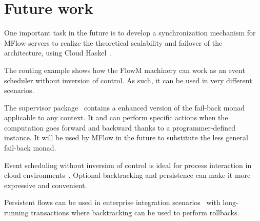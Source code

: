 \documentclass{tmr}
\begin{document}
\section{Future work}  
  
One important task in the future is to develop a synchronization mechanism for MFlow servers to realize the theoretical scalability and failover of the architecture, using Cloud Haskel~\cite{auth:cloudhaskell}.  
  
The routing example shows how the FlowM machinery can work as an event scheduler without inversion of control.  As such, it can be used in very different scenarios. 

The supervisor package~\cite{auth:supervisor} contains a enhanced version of the fail-back monad applicable to any context. It  and can perform specific actions when the computation goes forward and backward thanks to a programmer-defined instance. It will  be used by MFlow in the future to substitute the less general fail-back monad.


Event scheduling without inversion of control is ideal for process interaction in cloud environments~\cite{auth:scalacloud}. Optional backtracking and persistence can make it more expressive and convenient.  
  
Persistent flows can be used in enterprise integration scenarios~\cite{auth:integration} with long-running transactions where backtracking can be used to perform rollbacks.
  
  
  
  
\end{document}
